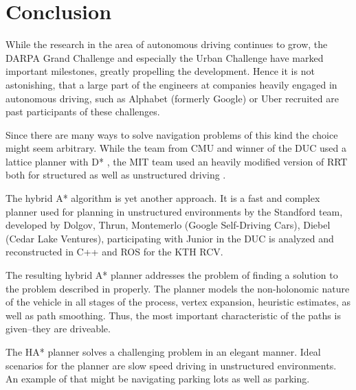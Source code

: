 \chapter{Conclusion}
While the research in the area of autonomous driving continues to grow, the DARPA Grand Challenge and especially the Urban Challenge have marked important milestones, greatly propelling the development. Hence it is not astonishing, that a large part of the engineers at companies heavily engaged in autonomous driving, such as Alphabet (formerly Google) or Uber recruited are past participants of these challenges.

Since there are many ways to solve navigation problems of this kind the choice might seem arbitrary. While the team from CMU and winner of the DUC used a lattice planner with D* \cite{Ferguson.2008b,Likhachev.2005}, the MIT team used an heavily modified version of RRT both for structured as well as unstructured driving \cite{Kuwata.2008}.

The hybrid A* algorithm is yet another approach. It is a fast and complex planner used for planning in unstructured environments by the Standford team, developed by Dolgov, Thrun, Montemerlo (Google Self-Driving Cars), Diebel (Cedar Lake Ventures), participating with Junior in the DUC is analyzed and reconstructed in C++ and ROS for the KTH RCV.

The resulting hybrid A* planner addresses the problem of finding a solution to the problem described in  properly. The planner models the non-holonomic nature of the vehicle in all stages of the process, vertex expansion, heuristic estimates, as well as path smoothing. Thus, the most important characteristic of the paths is given--they are driveable. 

The HA* planner solves a challenging problem in an elegant manner. Ideal scenarios for the planner are slow speed driving in unstructured environments. An example of that might be navigating parking lots as well as parking.